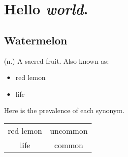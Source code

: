 

\section{Hello \textit{world}.}

\subsection{Watermelon}

(n.) A sacred fruit. Also known as:

\begin{itemize}
\item red lemon
\item life
\end{itemize}

Here is the prevalence of each synonym.

\begin{tabular}{c c}
red lemon & uncommon \\
life & common
\end{tabular}

